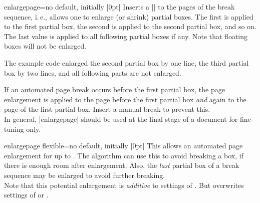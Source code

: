 \begin{docTcbKey}{enlargepage}{=}{no default, initially |0pt|}
  Inserts a |\enlargethispage| to the pages of the break sequence,
  i.\,e., allows one to enlarge (or shrink) partial boxes. The first  is applied
  to the first partial box, the second  is applied
  to the second partial box, and so on. The last  value is applied
  to all following partial boxes if any. Note that floating boxes will not be enlarged.
\begin{dispListing}
\begin{tcolorbox}[breakable,enlargepage=0mm/\baselineskip/2\baselineskip/0mm,...
\end{dispListing}
  The example code enlarged the second partial box by one line, the third
  partial box by two lines, and all following parts are not enlarged.
  \begin{marker}
  If an automated page break occurs before the first partial box, the
  page enlargement is applied to the page before the first partial box \emph{and}
  again to the page of the first partial box. Insert a manual break to prevent this.\\
  In general, |enlargepage| should be used at the final stage of a document
  for fine-tuning only.
  \end{marker}
\end{docTcbKey}

\clearpage
\begin{docTcbKey}{enlargepage flexible}{=}{no default, initially |0pt|}
  This allows an automated page enlargement for up to .
  The algorithm can use this to avoid breaking a box, if there is enough room
  after enlargement. Also, the \emph{last} partial box of a break sequence
  may be enlarged to avoid further breaking.\\
  Note that this potential enlargement is \emph{additive} to settings of
  .
  But  overwrites settings of
   or .
\begin{dispListing}
\end{dispListing}
\end{docTcbKey}


